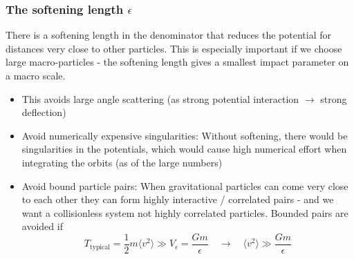 \subsubsection{The softening length $\epsilon$}
There is a softening length in 
the denominator \textcolor{blue1}{that reduces the 
potential for distances very close 
to other particles}. This is especially 
important if we choose large 
macro-particles - the softening 
length gives a smallest impact parameter 
on a macro scale.

\begin{itemize}
    \item This avoids large angle scattering (as strong potential interaction $\rightarrow$ strong deflection)
    \item \textcolor{green1}{Avoid numerically expensive singularities}: Without softening, there would be singularities in the potentials, which would cause high numerical effort when integrating the orbits (as of the large numbers)
    \item \textcolor{green1}{Avoid bound particle pairs}: When gravitational particles can come very close to each other they can form highly interactive / correlated pairs - and we want a collisionless system not highly correlated particles.
    Bounded pairs are avoided if
    \begin{equation}
        T_\text{typical} = \frac{1}{2} m \langle v^2 \rangle \gg V_\epsilon = \frac{Gm}{\epsilon} \quad \rightarrow \quad  \langle v^2 \rangle \gg \frac{Gm}{\epsilon}
    \end{equation}
\end{itemize}


\pagebreak